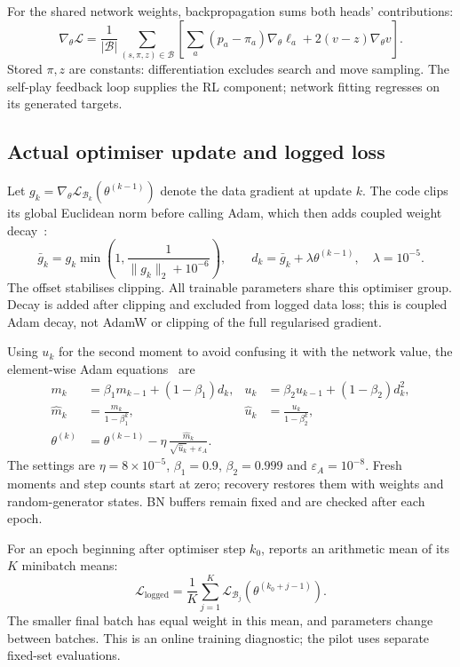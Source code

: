 \documentclass[letterpaper]{article}
\begin{document}
For the shared network weights, backpropagation sums both heads' contributions:
\begin{equation}
 \nabla_\theta\mathcal L=
 \frac1{|\mathcal B|}\sum_{(s,\pi,z)\in\mathcal B}
 \left[\sum_a(p_a-\pi_a)\nabla_\theta\ell_a
       +2(v-z)\nabla_\theta v\right].
 \label{eq:shared-gradient}
\end{equation}
Stored $\pi,z$ are constants: differentiation excludes search and move sampling.
The self-play feedback loop supplies the RL component; network fitting regresses
on its generated targets.

\subsection{Actual optimiser update and logged loss}
\label{app:optimiser-math}
Let $g_k=\nabla_\theta\mathcal L_{\mathcal B_k}(\theta^{(k-1)})$ denote the data
gradient at update $k$. The code clips its global Euclidean norm before calling
Adam, which then adds coupled weight decay~\cite{pytorch-adam}:
\begin{equation}
 \bar g_k=g_k\min\!\left(1,\frac{1}{\|g_k\|_2+10^{-6}}\right),\qquad
 d_k=\bar g_k+\lambda\theta^{(k-1)},\quad\lambda=10^{-5}.
 \label{eq:clipped-decay}
\end{equation}
The offset stabilises clipping. All trainable parameters share this optimiser
group. Decay is added after clipping and excluded from logged data loss; this
is coupled Adam decay, not AdamW or clipping of the full regularised gradient.

Using $u_k$ for the second moment to avoid confusing it with the network value,
the element-wise Adam equations~\cite{kingma2015} are
\begin{align}
 m_k&=\beta_1m_{k-1}+(1-\beta_1)d_k,
 &u_k&=\beta_2u_{k-1}+(1-\beta_2)d_k^2,\\
 \widehat m_k&=\frac{m_k}{1-\beta_1^k},
 &\widehat u_k&=\frac{u_k}{1-\beta_2^k},\\
 \theta^{(k)}&=\theta^{(k-1)}-\eta\,
 \frac{\widehat m_k}{\sqrt{\widehat u_k}+\varepsilon_A}.
 \label{eq:adam}
\end{align}
The settings are $\eta=8\times10^{-5}$, $\beta_1=0.9$, $\beta_2=0.999$ and
$\varepsilon_A=10^{-8}$. Fresh moments and step counts start at zero; recovery
restores them with weights and random-generator states. BN buffers remain fixed
and are checked after each epoch.

For an epoch beginning after optimiser step $k_0$,  reports
an arithmetic mean of its $K$ minibatch means:
\begin{equation}
 \mathcal L_{\mathrm{logged}}=\frac1K\sum_{j=1}^K
 \mathcal L_{\mathcal B_j}(\theta^{(k_0+j-1)}).
 \label{eq:logged-loss}
\end{equation}
The smaller final batch has equal weight in this mean, and parameters change
between batches. This is an online training diagnostic; the pilot uses separate
fixed-set evaluations.
\end{document}
